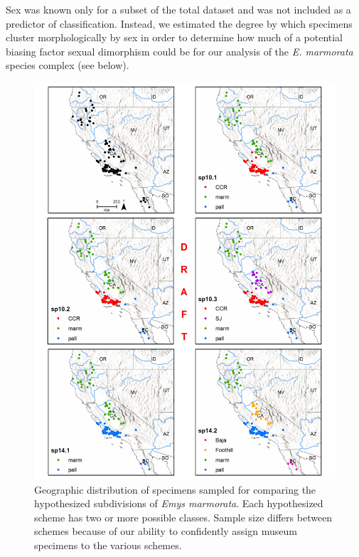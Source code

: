\documentclass[12pt,letterpaper]{article}
\begin{document}
Sex was known only for a subset of the total dataset and was not included as a predictor of classification. Instead, we estimated the degree by which specimens cluster morphologically by sex in order to determine how much of a potential biasing factor sexual dimorphism could be for our analysis of the \textit{E. marmorata} species complex (see below).


\begin{figure}[h]
  \centering
  \includegraphics[height = 0.8\textheight, width = \textwidth, keepaspectratio = true]{figure/Ken_Ang_SpLoc_DRAFT}
  \caption{Geographic distribution of specimens sampled for comparing the hypothesized subdivisions of \textit{Emys marmorata}. Each hypothesized scheme has two or more possible classes. Sample size differs between schemes because of our ability to confidently assign museum specimens to the various schemes.}
  \label{fig:map}
\end{figure}
\end{document}
